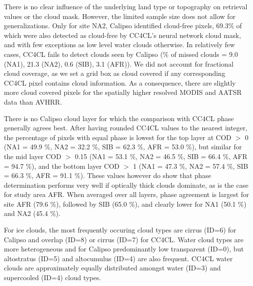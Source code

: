 There is no clear influence of the underlying land type or topography on retrieval values or the cloud mask. However, the limited sample size does not allow for generalizations. Only for site NA2, Calipso identified cloud-free pixels, 69.3\% of which were also detected as cloud-free by CC4CL's neural network cloud mask, and with few exceptions as low level water clouds otherwise. In relatively few cases, CC4CL fails to detect clouds seen by Calipso (\% of missed clouds = 9.0 (NA1), 21.3 (NA2), 0.6 (SIB), 3.1 (AFR)). We did not account for fractional cloud coverage, as we set a grid box as cloud covered if any corresponding CC4CL pixel contains cloud information. As a consequence, there are slightly more cloud covered pixels for the spatially higher resolved MODIS and AATSR data than AVHRR.

There is no Calipso cloud layer for which the comparison with CC4CL phase generally agrees best. After having rounded CC4CL values to the nearest integer, the percentage of pixels with equal phase is lowest for the top layer at COD $>$ 0 (NA1 = 49.9 \%, NA2 = 32.2 \%, SIB = 62.3 \%, AFR = 53.0 \%), but similar for the mid layer COD $>$ 0.15 (NA1 = 53.1 \%, NA2 = 46.5 \%, SIB = 66.4 \%, AFR = 94.7 \%), and the bottom layer COD $>$ 1 (NA1 = 47.3 \%, NA2 = 57.4 \%, SIB = 66.3 \%, AFR = 91.1 \%). These values however do show that phase determination performs very well if optically thick clouds dominate, as is the case for study area AFR. When averaged over all layers, phase agreement is largest for site AFR (79.6 \%), followed by SIB (65.0 \%), and clearly lower for NA1 (50.1 \%) and NA2 (45.4 \%).

For ice clouds, the most frequently occuring cloud types are cirrus (ID=6) for Calipso and overlap (ID=8) or cirrus (ID=7) for CC4CL. Water cloud types are more heterogeneous and for Calipso predominantly low transparent (ID=0), but altostratus (ID=5) and altocumulus (ID=4) are also frequent. CC4CL water clouds are approximately equally distributed amongst water (ID=3) and supercooled (ID=4) cloud types. %

